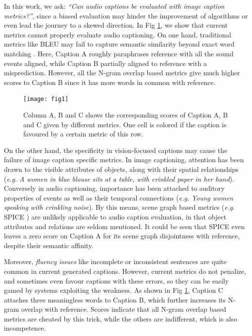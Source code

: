 \documentclass{article}
\begin{document}
In this work, we ask: \textit{``Can audio captions be evaluated with image caption metrics?''}, since a biased evaluation may hinder the improvement of algorithms or even lead the journey to a skewed direction. In Fig \ref{fig:example}, we show that current metrics cannot properly evaluate audio captioning. On one hand, traditional metrics like BLEU may fail to capture semantic similarity beyond exact word matching \cite{novikova2017we, chaganty2018price}. Here, Caption A roughly paraphrases reference with all the sound events aligned, while Caption B partially aligned to reference with a misprediction. However, all the N-gram overlap based metrics give much higher scores to Caption B since it has more words in common with reference. 

\begin{figure}[tbp]
  \centering
  \texttt{[image: fig1]}
  \caption{Column A, B and C shows the corresponding scores of Caption A, B and C given by different metrics. One cell is colored if the caption is favoured by a certain metric of this row. }
  \label{fig:example}
\end{figure}

On the other hand, the specificity in vision-focused captions may cause the failure of image caption specific metrics. 
In image captioning, attention has been drawn to the visible attributes of objects, along with their spatial relationships (\textit{e.g. A women in blue blouse sits at a table, with crinkled paper in her hand}). 
Conversely in audio captioning, importance has been attached to auditory properties of events as well as their temporal connections (\textit{e.g. Young women speaking with crinkling noise}). 
By this means, scene graph based metrics (\textit{e.g.} SPICE \cite{anderson2016spice}) are unlikely applicable to audio caption evaluation, in that object attributes and relations are seldom mentioned. 
It could be seen 
that SPICE even leaves a zero score on Caption A for its scene graph disjointness with reference, despite their semantic affinity. 

Moreover, \textit{fluency issues} like incomplete or inconsistent sentences are quite common in current generated captions. However, current metrics do not penalize, and sometimes even favour captions with these errors, so they can be easily gamed by systems exploiting the weakness. 
As shown in Fig \ref{fig:example}, Caption C attaches three meaningless words to Caption B, which further increases its N-gram overlap with reference. 
Scores indicate that all N-gram overlap based metrics are cheated by this trick, while the others are indifferent, which is also incompetence.  
\end{document}
